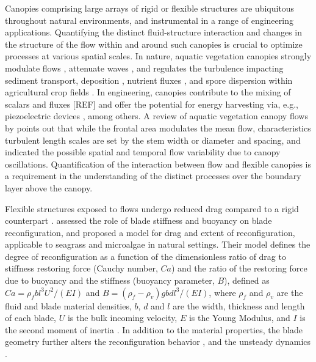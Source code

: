 \documentclass[lineno,authoryear]{FLO_v1}%
\theoremstyle{definition}
\begin{document}
Canopies comprising large arrays of rigid or flexible structures are ubiquitous throughout natural 
environments, and instrumental in a range of engineering applications. Quantifying the distinct 
fluid-structure interaction and changes in the structure of the flow within and around such canopies 
is crucial to optimize processes at various spatial scales. In nature, aquatic vegetation canopies  
strongly modulate flows \citep{gambi1990flume,chen2013flow}, attenuate waves 
\citep{fonseca1992preliminary,paul2012wave}, and regulates the turbulence impacting sediment 
transport, deposition \citep{lefebvre2010influence,ortiz2013mean}, 
nutrient fluxes \citep{mcglathery2007eutrophication, lawson2012enhancement}, 
and spore dispersion within agricultural crop fields \citep{mccartney1994dispersal}. 
In engineering, canopies contribute to the mixing of scalars and fluxes [REF] and offer 
the potential for energy harvesting via, e.g., piezoelectric devices \citep{bae2014flutter}, among others.
A review of aquatic vegetation canopy flows by \citet{nepf2012flow} points out that while 
the frontal area modulates the mean flow, characteristics turbulent length scales are set by 
the stem width or diameter and spacing, and indicated the possible spatial and temporal flow 
variability due to canopy oscillations. Quantification of the interaction between flow and 
flexible canopies is a requirement in the understanding of the distinct processes over the 
boundary layer above the canopy. 


Flexible structures exposed to flows undergo reduced drag compared to a rigid counterpart
 \citep{vogel1984drag, gosselin2010drag}.  
 \cite{luhar2011flow} assessed the role of blade stiffness and 
 buoyancy on blade reconfiguration, and proposed a model for drag and extent 
 of reconfiguration, applicable to seagrass and microalgae in natural settings. 
 Their model defines the degree of reconfiguration as a function of the dimensionless 
 ratio of drag to stiffness restoring force (Cauchy number, $Ca$) and the ratio of the 
 restoring force due to buoyancy and the stiffness (buoyancy parameter, $B$), defined 
 as $Ca=\rho_f bl^{3}U^{2}/(EI)$ and $B= (\rho_f - \rho_v) gbdl^{3}/(EI)$, where
   $\rho_{f}$ and $\rho_{v}$ are the fluid and blade material densities,  $b$, $d$ and $l$ are 
   the width, thickness and length of each blade,  $U$  is the bulk incoming velocity, $E$ is 
   the Young Modulus, and  $I$  is the second moment of inertia \citep{luhar2016wave}. In addition 
   to the material properties, the blade geometry further alters the reconfiguration behavior 
   \citep{albayrak2012flow}, and the unsteady dynamics \citep{jin2018flow}.
\end{document}
